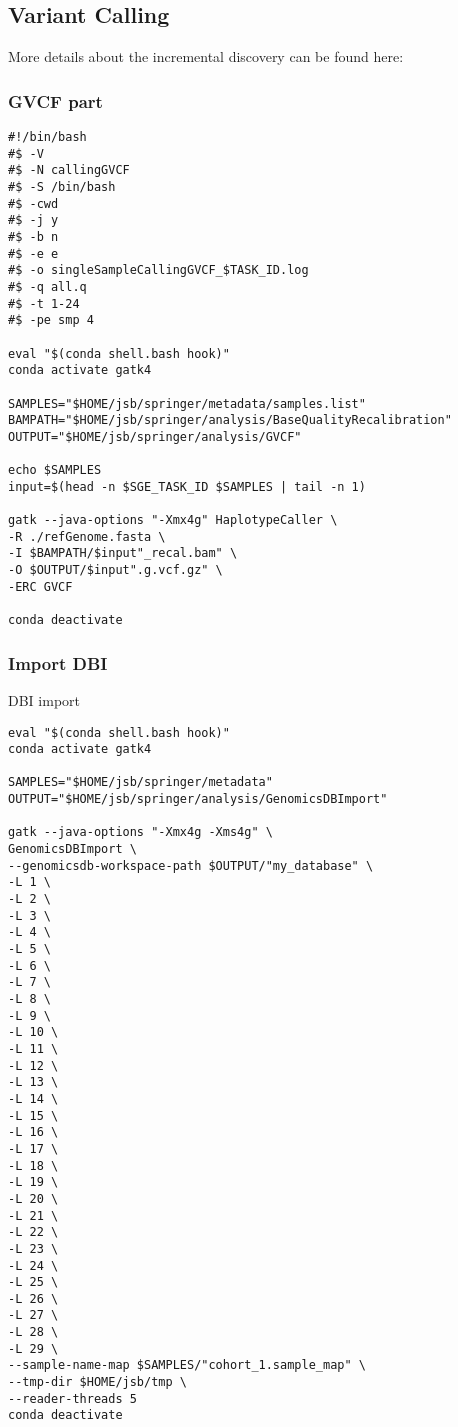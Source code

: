 \subsection{Variant Calling}

More details about the incremental discovery can be found here:

\subsubsection{GVCF part}
\begin{verbatim}
#!/bin/bash
#$ -V
#$ -N callingGVCF
#$ -S /bin/bash
#$ -cwd
#$ -j y
#$ -b n
#$ -e e
#$ -o singleSampleCallingGVCF_$TASK_ID.log
#$ -q all.q
#$ -t 1-24
#$ -pe smp 4

eval "$(conda shell.bash hook)"
conda activate gatk4

SAMPLES="$HOME/jsb/springer/metadata/samples.list"
BAMPATH="$HOME/jsb/springer/analysis/BaseQualityRecalibration"
OUTPUT="$HOME/jsb/springer/analysis/GVCF"

echo $SAMPLES
input=$(head -n $SGE_TASK_ID $SAMPLES | tail -n 1)

gatk --java-options "-Xmx4g" HaplotypeCaller \
-R ./refGenome.fasta \
-I $BAMPATH/$input"_recal.bam" \
-O $OUTPUT/$input".g.vcf.gz" \
-ERC GVCF

conda deactivate
\end{verbatim}





\subsubsection{Import DBI }

DBI import

\begin{verbatim}
eval "$(conda shell.bash hook)"
conda activate gatk4

SAMPLES="$HOME/jsb/springer/metadata"
OUTPUT="$HOME/jsb/springer/analysis/GenomicsDBImport"

gatk --java-options "-Xmx4g -Xms4g" \
GenomicsDBImport \
--genomicsdb-workspace-path $OUTPUT/"my_database" \
-L 1 \
-L 2 \
-L 3 \
-L 4 \
-L 5 \
-L 6 \
-L 7 \
-L 8 \
-L 9 \
-L 10 \
-L 11 \
-L 12 \
-L 13 \
-L 14 \
-L 15 \
-L 16 \
-L 17 \
-L 18 \
-L 19 \
-L 20 \
-L 21 \
-L 22 \
-L 23 \
-L 24 \
-L 25 \
-L 26 \
-L 27 \
-L 28 \
-L 29 \
--sample-name-map $SAMPLES/"cohort_1.sample_map" \
--tmp-dir $HOME/jsb/tmp \
--reader-threads 5
conda deactivate

\end{verbatim}










